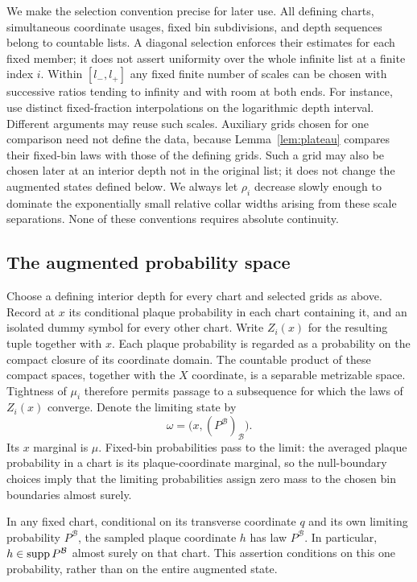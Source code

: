 We make the selection convention precise for later use. All defining
charts, simultaneous coordinate usages, fixed bin subdivisions, and
depth sequences belong to countable lists. A diagonal selection
enforces their estimates for each fixed member; it does not assert
uniformity over the whole infinite list at a finite index $i$.
Within $[l_-,l_+]$ any fixed finite number of scales can be chosen
with successive ratios tending to infinity and with room at both
ends. For instance, use distinct fixed-fraction interpolations on
the logarithmic depth interval. Different arguments may reuse such
scales. Auxiliary grids chosen for one comparison need not define
the data, because Lemma~\ref{lem:plateau} compares their fixed-bin
laws with those of the defining grids. Such a grid may also be
chosen later at an interior depth not in the original list; it
does not change the augmented states defined below. We always let $\rho_i$ decrease
slowly enough to dominate the exponentially small relative collar
widths arising from these scale separations. None of these conventions
requires absolute continuity.

\subsection{The augmented probability space}

Choose a defining interior depth for every chart and selected grids
as above. Record at $x$ its conditional plaque probability in each
chart containing it, and an isolated dummy symbol for every other
chart. Write $Z_i(x)$ for the resulting tuple together with $x$.
Each plaque probability is regarded as a probability on the compact
closure of its coordinate domain. The countable product of these
compact spaces, together with the $X$ coordinate, is a separable
metrizable space. Tightness of $\mu_i$ therefore permits passage to
a subsequence for which the laws of $Z_i(x)$ converge. Denote the
limiting state by
\[
 \omega=\bigl(x,(P^{\mathcal B})_{\mathcal B}\bigr).
\]
Its $x$ marginal is $\mu$. Fixed-bin probabilities pass to the limit:
the averaged plaque probability in a chart is its plaque-coordinate
marginal, so the null-boundary choices imply that the limiting
probabilities assign zero mass to the chosen bin boundaries almost
surely.

\begin{lemma}\label{lem:sampling}
In any fixed chart, conditional on its transverse coordinate $q$
and its own limiting probability $P^{\mathcal B}$, the sampled
plaque coordinate $h$ has law $P^{\mathcal B}$. In particular,
$h\in\operatorname{supp} P^{\mathcal B}$ almost surely on that chart. This assertion
conditions on this one probability, rather than on the entire
augmented state.
\end{lemma}

